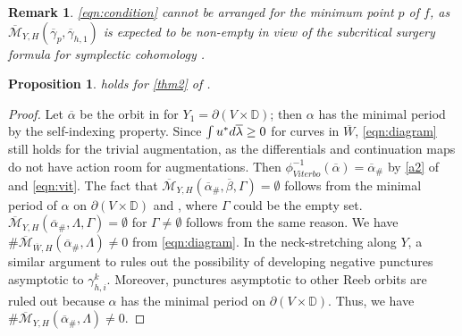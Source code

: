 \documentclass[reqno,11pt]{amsart}
\numberwithin{equation}{section}
\newtheorem{proposition}[theorem]{\textbf{Proposition}}
\newtheorem{remark}[theorem]{\textbf{Remark}}
\def\D{{\mathbb D}}
\def\cM{{\mathcal M}}
\def\rd{{\rm d}}
\begin{document}
\begin{remark}
    \eqref{eqn:condition} cannot be arranged for the minimum point $p$ of $f$, as $\overline{\cM}_{Y,H}(\overline{\gamma}_p,\overline{\gamma}_{h,1})$ is expected to be non-empty in view of the subcritical surgery formula for symplectic cohomology \cite{zbMATH01798901}. 
\end{remark}

\begin{proposition}\label{prop:corb'}
      holds for \eqref{thm2} of .
\end{proposition}
\begin{proof}
    Let $\overline{\alpha}$ be the orbit in  for $Y_1=\partial(V\times \D)$; then $\alpha$ has the minimal period by the self-indexing property. Since $\int u^*\rd \overline{\lambda}\ge 0$ for curves in $\overline{W}$, \eqref{eqn:diagram} still holds for the trivial augmentation, as the differentials and continuation maps do not have action room for augmentations.  Then $\phi_{Viterbo}^{-1}(\overline{\alpha})=\overline{\alpha}_\#$ by \eqref{a2} of  and \eqref{eqn:vit}. The fact that $\overline{\cM}_{Y,H}(\overline{\alpha}_\#,\overline{\beta},\Gamma)=\emptyset$ follows from the minimal period of $\alpha$ on $\partial(V\times \D)$ and , where $\Gamma$ could be the empty set. $\overline{\cM}_{Y,H}(\overline{\alpha}_\#,\Lambda ,\Gamma)=\emptyset$ for $\Gamma \ne \emptyset$ follows from the same reason. We have $\# \overline{\cM}_{\overline{W},H}(\overline{\alpha}_\#,\Lambda)\ne 0$ from \eqref{eqn:diagram}. In the neck-stretching along $Y$, a similar argument to  rules out the possibility of developing negative punctures asymptotic to $\gamma_{h,i}^k$. Moreover, punctures asymptotic to other Reeb orbits are ruled out because $\alpha$ has the minimal period on $\partial(V\times \D)$. Thus, we have $\# \overline{\cM}_{Y,H}(\overline{\alpha}_\#,\Lambda)\ne 0$. 
\end{proof}
\end{document}
